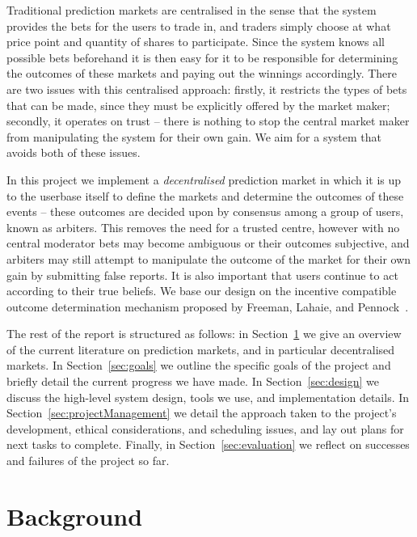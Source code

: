 \documentclass[10pt,a4paper]{article}
\theoremstyle{plain}
\theoremstyle{definition}
\begin{document}
Traditional prediction markets are centralised in the sense that the system
provides the bets for the users to trade in, and traders simply choose at what
price point and quantity of shares to participate. Since the system knows all
possible bets beforehand it is then easy for it to be responsible for
determining the outcomes of these markets and paying out the winnings
accordingly. There are two issues with this centralised approach: firstly, it
restricts the types of bets that can be made, since they must be explicitly
offered by the market maker; secondly, it operates on trust -- there is nothing
to stop the central market maker from manipulating the system for their own
gain. We aim for a system that avoids both of these issues.

In this project we implement a \emph{decentralised} prediction market in which
it is up to the userbase itself to define the markets and determine the
outcomes of these events -- these outcomes are decided upon by consensus among
a group of users, known as arbiters. This removes the need for a trusted
centre, however with no central moderator bets may become ambiguous or their
outcomes subjective, and arbiters may still attempt to manipulate the outcome
of the market for their own gain by submitting false reports. It is also
important that users continue to act according to their true beliefs. We base
our design on the incentive compatible outcome determination mechanism proposed
by Freeman, Lahaie, and Pennock~\cite{CODiPM}.

The rest of the report is structured as follows: in
Section~\ref{sec:background} we give an overview of the current literature on
prediction markets, and in particular decentralised markets. In
Section~\ref{sec:goals} we outline the specific goals of the project and
briefly detail the current progress we have made. In Section~\ref{sec:design}
we discuss the high-level system design, tools we use, and implementation
details. In Section~\ref{sec:projectManagement} we detail the approach taken to
the project's development, ethical considerations, and scheduling issues, and
lay out plans for next tasks to complete. Finally, in
Section~\ref{sec:evaluation} we reflect on successes and failures of the
project so far.

\section{Background}

\label{sec:background}
\end{document}

